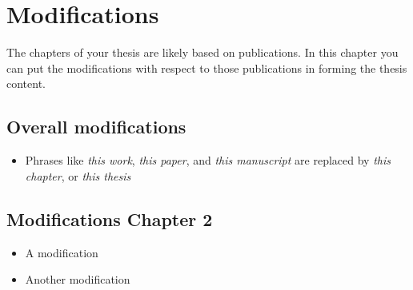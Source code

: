 \chapter*{Modifications}\label{chap: Modifications}

The chapters of your thesis are likely based on publications. In this chapter you can put the modifications with respect to those publications in forming the thesis content.

\section*{Overall modifications}
\begin{itemize}
    \item Phrases like \textit{this work}, \textit{this paper}, and \textit{this manuscript} are replaced by \textit{this chapter}, or \textit{this thesis}
\end{itemize}

\section*{Modifications Chapter 2}
\begin{itemize}
    \item A modification
    \item Another modification
\end{itemize}
